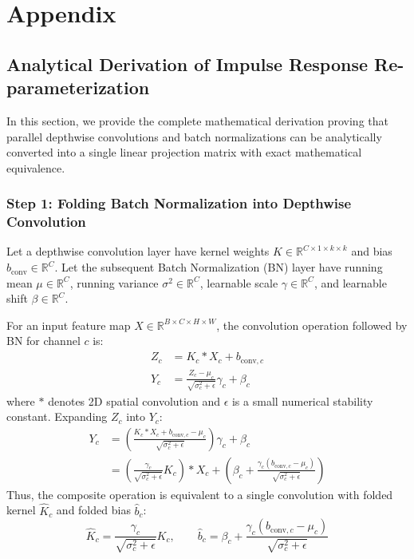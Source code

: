 \section{Appendix}
\label{section:appendix}

\subsection{Analytical Derivation of Impulse Response Re-parameterization}
\label{appendix:reparam_derivation}

In this section, we provide the complete mathematical derivation proving that parallel depthwise convolutions and batch normalizations can be analytically converted into a single linear projection matrix with exact mathematical equivalence.

\subsubsection{Step 1: Folding Batch Normalization into Depthwise Convolution}
Let a depthwise convolution layer have kernel weights $K \in \mathbb{R}^{C \times 1 \times k \times k}$ and bias $b_{\text{conv}} \in \mathbb{R}^C$. Let the subsequent Batch Normalization (BN) layer have running mean $\mu \in \mathbb{R}^C$, running variance $\sigma^2 \in \mathbb{R}^C$, learnable scale $\gamma \in \mathbb{R}^C$, and learnable shift $\beta \in \mathbb{R}^C$.

For an input feature map $X \in \mathbb{R}^{B \times C \times H \times W}$, the convolution operation followed by BN for channel $c$ is:
\begin{align}
    Z_c &= K_c * X_c + b_{\text{conv}, c} \\
    Y_c &= \frac{Z_c - \mu_c}{\sqrt{\sigma_c^2 + \epsilon}} \gamma_c + \beta_c
\end{align}
where $*$ denotes 2D spatial convolution and $\epsilon$ is a small numerical stability constant. Expanding $Z_c$ into $Y_c$:
\begin{align}
    Y_c &= \left( \frac{K_c * X_c + b_{\text{conv}, c} - \mu_c}{\sqrt{\sigma_c^2 + \epsilon}} \right) \gamma_c + \beta_c \\
        &= \left( \frac{\gamma_c}{\sqrt{\sigma_c^2 + \epsilon}} K_c \right) * X_c + \left( \beta_c + \frac{\gamma_c (b_{\text{conv}, c} - \mu_c)}{\sqrt{\sigma_c^2 + \epsilon}} \right)
\end{align}
Thus, the composite operation is equivalent to a single convolution with folded kernel $\widehat{K}_c$ and folded bias $\widehat{b}_c$:
\begin{equation}
    \widehat{K}_c = \frac{\gamma_c}{\sqrt{\sigma_c^2 + \epsilon}} K_c, \qquad \widehat{b}_c = \beta_c + \frac{\gamma_c (b_{\text{conv}, c} - \mu_c)}{\sqrt{\sigma_c^2 + \epsilon}}
\end{equation}

